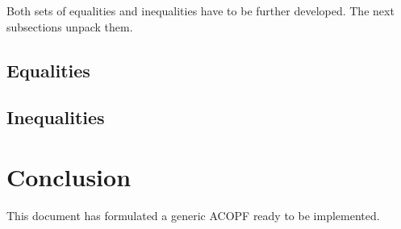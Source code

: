 \documentclass{article}
\begin{document}
Both sets of equalities and inequalities have to be further developed. The next subsections unpack them.

\subsection{Equalities}

\subsection{Inequalities}


\section{Conclusion}

This document has formulated a generic ACOPF ready to be implemented. 

\end{document}

